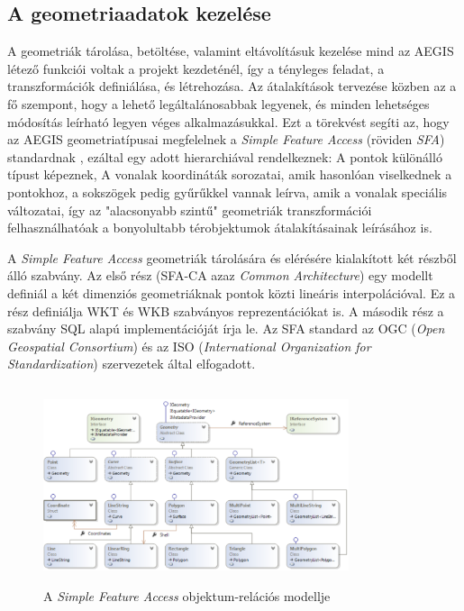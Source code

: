 \subsection{A geometriaadatok kezelése}
A geometriák tárolása, betöltése, valamint eltávolításuk kezelése mind az AEGIS létező funkciói voltak a projekt kezdeténél, így a tényleges feladat, a transzformációk definiálása, és létrehozása.
Az átalakítások tervezése közben az a fő szempont, hogy a lehető legáltalánosabbak legyenek, és minden lehetséges módosítás leírható legyen véges alkalmazásukkal. Ezt a törekvést segíti az, hogy az AEGIS geometriatípusai megfelelnek a \emph{Simple Feature Access} (röviden \emph{SFA}) standardnak \cite{sfa}, ezáltal egy adott hierarchiával rendelkeznek: A pontok különálló típust képeznek, A vonalak koordináták sorozatai, amik hasonlóan viselkednek a pontokhoz, a sokszögek pedig gyűrűkkel vannak leírva, amik a vonalak speciális változatai, így az "alacsonyabb szintű" geometriák transzformációi felhasználhatóak a bonyolultabb térobjektumok átalakításainak leírásához is.
\begin{note}
A \emph{Simple Feature Access} geometriák tárolására és elérésére kialakított két részből álló szabvány. Az első rész (SFA-CA azaz \emph{Common Architecture}) egy modellt definiál a két dimenziós geometriáknak pontok közti lineáris interpolációval. Ez a rész definiálja WKT és WKB szabványos reprezentációkat is. A második rész a szabvány SQL alapú implementációját írja le. Az SFA standard az OGC (\emph{Open Geospatial Consortium}) és az ISO (\emph{International Organization for Standardization}) szervezetek által elfogadott.
\begin{figure}[H]
	\centering
	\includegraphics[width=0.8\textwidth,height=220px]{images/sfa.png}
	\caption{A \emph{Simple Feature Access} objektum-relációs modellje}
	\label{fig:picture-8}
\end{figure}
\end{note}

